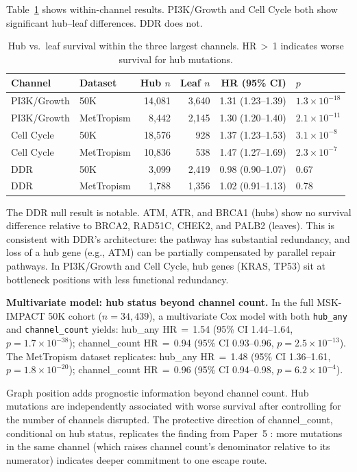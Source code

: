 \documentclass[11pt]{article}
\begin{document}
Table~\ref{tab:within-channel} shows within-channel results.
PI3K/Growth and Cell Cycle both show significant hub--leaf differences.
DDR does not.

\begin{table}[ht]
\centering
\caption{Hub vs.\ leaf survival within the three largest channels.
HR\,$>$\,1 indicates worse survival for hub mutations.}
\label{tab:within-channel}
\begin{tabular}{@{}llrrrl@{}}
\toprule
Channel & Dataset & Hub $n$ & Leaf $n$ & HR (95\% CI) & $p$ \\
\midrule
PI3K/Growth & 50K & 14{,}081 & 3{,}640 & 1.31 (1.23--1.39) & $1.3 \times 10^{-18}$ \\
PI3K/Growth & MetTropism & 8{,}442 & 2{,}145 & 1.30 (1.20--1.40) & $2.1 \times 10^{-11}$ \\
Cell Cycle & 50K & 18{,}576 & 928 & 1.37 (1.23--1.53) & $3.1 \times 10^{-8}$ \\
Cell Cycle & MetTropism & 10{,}836 & 538 & 1.47 (1.27--1.69) & $2.3 \times 10^{-7}$ \\
DDR & 50K & 3{,}099 & 2{,}419 & 0.98 (0.90--1.07) & 0.67 \\
DDR & MetTropism & 1{,}788 & 1{,}356 & 1.02 (0.91--1.13) & 0.78 \\
\bottomrule
\end{tabular}
\end{table}

The DDR null result is notable. ATM, ATR, and BRCA1 (hubs) show no
survival difference relative to BRCA2, RAD51C, CHEK2, and PALB2
(leaves). This is consistent with DDR's architecture: the pathway has
substantial redundancy, and loss of a hub gene (e.g., ATM) can be
partially compensated by parallel repair pathways. In PI3K/Growth and
Cell Cycle, hub genes (KRAS, TP53) sit at bottleneck positions with
less functional redundancy.

\textbf{Multivariate model: hub status beyond channel count.}
In the full MSK-IMPACT 50K cohort ($n = 34{,}439$), a multivariate
Cox model with both \texttt{hub\_any} and \texttt{channel\_count}
yields: hub\_any HR\,$=$\,1.54 (95\% CI 1.44--1.64,
$p = 1.7 \times 10^{-38}$); channel\_count HR\,$=$\,0.94 (95\% CI
0.93--0.96, $p = 2.5 \times 10^{-13}$). The MetTropism dataset
replicates: hub\_any HR\,$=$\,1.48 (95\% CI 1.36--1.61,
$p = 1.8 \times 10^{-20}$); channel\_count HR\,$=$\,0.96 (95\% CI
0.94--0.98, $p = 6.2 \times 10^{-4}$).

Graph position adds prognostic information beyond channel count.
Hub mutations are independently associated with worse survival after
controlling for the number of channels disrupted. The protective
direction of channel\_count, conditional on hub status, replicates the
finding from Paper~5 \cite{McCarthy2026e}: more mutations in the same
channel (which raises channel count's denominator relative to its
numerator) indicates deeper commitment to one escape route.
\end{document}
